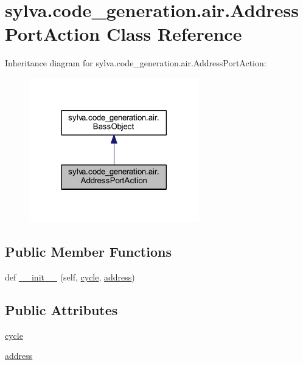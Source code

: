 \hypertarget{classsylva_1_1code__generation_1_1air_1_1_address_port_action}{}\section{sylva.\+code\+\_\+generation.\+air.\+Address\+Port\+Action Class Reference}
\label{classsylva_1_1code__generation_1_1air_1_1_address_port_action}


Inheritance diagram for sylva.\+code\+\_\+generation.\+air.\+Address\+Port\+Action\+:\nopagebreak
\begin{figure}[H]
\begin{center}
\leavevmode
\includegraphics[width=209pt]{classsylva_1_1code__generation_1_1air_1_1_address_port_action__inherit__graph}
\end{center}
\end{figure}
\subsection*{Public Member Functions}
\begin{DoxyCompactItemize}
\item 
def \hyperlink{classsylva_1_1code__generation_1_1air_1_1_address_port_action_a55bb107bc3e09993e527f5ab0db08c0a}{\+\_\+\+\_\+init\+\_\+\+\_\+} (self, \hyperlink{classsylva_1_1code__generation_1_1air_1_1_address_port_action_aa6bd7cd1cbf6cf3a36e02329a88affbf}{cycle}, \hyperlink{classsylva_1_1code__generation_1_1air_1_1_address_port_action_a6a2ed473ad0902a5fb0128e61b42c988}{address})
\end{DoxyCompactItemize}
\subsection*{Public Attributes}
\begin{DoxyCompactItemize}
\item 
\hyperlink{classsylva_1_1code__generation_1_1air_1_1_address_port_action_aa6bd7cd1cbf6cf3a36e02329a88affbf}{cycle}
\item 
\hyperlink{classsylva_1_1code__generation_1_1air_1_1_address_port_action_a6a2ed473ad0902a5fb0128e61b42c988}{address}
\end{DoxyCompactItemize}


